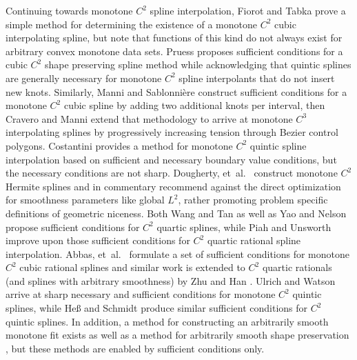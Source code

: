 Continuing towards monotone $C^2$ spline interpolation, Fiorot and
Tabka \cite{fiorot1991shape} prove a simple method for determining the
existence of a monotone $C^2$ cubic interpolating spline, but note
that functions of this kind do not always exist for arbitrary convex
monotone data sets.  Pruess \cite{pruess1993shape} proposes sufficient
conditions for a cubic $C^2$ shape preserving spline method while
acknowledging that quintic splines are generally necessary for
monotone $C^2$ spline interpolants that do not insert new
knots. Similarly, Manni and Sablonni\`ere \cite{manni1997monotone}
construct sufficient conditions for a monotone $C^2$ cubic spline by
adding two additional knots per interval, then Cravero and Manni
\cite{cravero2003shape} extend that methodology to arrive at monotone
$C^3$ interpolating splines by progressively increasing tension
through Bezier control polygons. Costantini
\cite{constantini1997boundary} provides a method for monotone $C^2$
quintic spline interpolation based on sufficient and necessary
boundary value conditions, but the necessary conditions are not
sharp. Dougherty, et\ al.\ \cite{dougherty1989nonnegativity} construct
monotone $C^2$ Hermite splines and in commentary recommend against the
direct optimization for smoothness parameters like global $L^2$,
rather promoting problem specific definitions of geometric
niceness. Both Wang and Tan \cite{wang2004rational} as well as Yao and
Nelson \cite{yao2018unconditionally} propose sufficient conditions for
$C^2$ quartic splines, while Piah and Unsworth \cite{piah2011improved}
improve upon those sufficient conditions for $C^2$ quartic rational
spline interpolation. Abbas, et\ al.\ \cite{abbas2012monotonicity}
formulate a set of sufficient conditions for monotone $C^2$ cubic
rational splines and similar work is extended to $C^2$ quartic
rationals (and splines with arbitrary smoothness) by Zhu and Han
\cite{zhu2015rational,zhu2015shape}. Ulrich and Watson
\cite{ulrich1990positivity} arrive at sharp necessary and sufficient
conditions for monotone $C^2$ quintic splines, while He{\ss} and
Schmidt \cite{hess1994positive} produce similar sufficient conditions
for $C^2$ quintic splines. In addition, a method for constructing an
arbitrarily smooth monotone fit exists
\cite{leitenstorfer2006generalized} as well as a method for
arbitrarily smooth shape preservation \cite{han2018shape}, but these
methods are enabled by sufficient conditions only.

